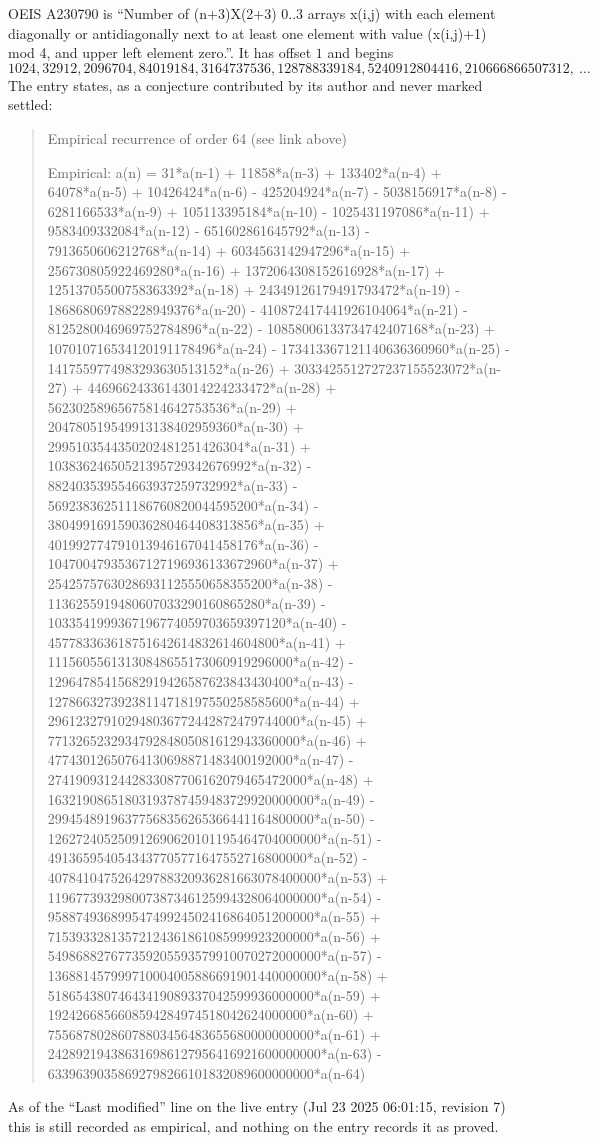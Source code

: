 \documentclass[11pt,a4paper]{article}
\theoremstyle{plain}
\theoremstyle{definition}
\begin{document}
OEIS A230790 is ``Number of (n+3)X(2+3) 0..3 arrays x(i,j) with each element diagonally or antidiagonally next to at least one element with value (x(i,j)+1) mod 4, and upper left element zero.''. It has offset $1$ and begins
\[
1024, 32912, 2096704, 84019184, 3164737536, 128788339184, 5240912804416, 210666866507312,\ \dots
\]
The entry states, as a conjecture contributed by its author and never marked settled:
\begin{quote}\raggedright\small
Empirical recurrence of order 64 (see link above)

Empirical: a(n) = 31*a(n-1) + 11858*a(n-3) + 133402*a(n-4) + 64078*a(n-5) + 10426424*a(n-6) - 425204924*a(n-7) - 5038156917*a(n-8) - 6281166533*a(n-9) + 105113395184*a(n-10) - 1025431197086*a(n-11) + 9583409332084*a(n-12) - 651602861645792*a(n-13) - 7913650606212768*a(n-14) + 6034563142947296*a(n-15) + 256730805922469280*a(n-16) + 1372064308152616928*a(n-17) + 12513705500758363392*a(n-18) + 24349126179491793472*a(n-19) - 186868069788228949376*a(n-20) - 410872417441926104064*a(n-21) - 8125280046969752784896*a(n-22) - 10858006133734742407168*a(n-23) + 107010716534120191178496*a(n-24) - 173413367121140636360960*a(n-25) - 1417559774983293630513152*a(n-26) + 3033425512727237155523072*a(n-27) + 44696624336143014224233472*a(n-28) + 56230258965675814642753536*a(n-29) + 204780519549913138402959360*a(n-30) + 2995103544350202481251426304*a(n-31) + 10383624650521395729342676992*a(n-32) - 882403539554663937259732992*a(n-33) - 569238362511186760820044595200*a(n-34) - 380499169159036280464408313856*a(n-35) + 401992774791013946167041458176*a(n-36) - 10470047935367127196936133672960*a(n-37) + 25425757630286931125550658355200*a(n-38) - 1136255919480607033290160865280*a(n-39) - 1033541999367196774059703659397120*a(n-40) - 457783363618751642614832614604800*a(n-41) + 11156055613130848655173060919296000*a(n-42) - 12964785415682919426587623843430400*a(n-43) - 12786632739238114718197550258585600*a(n-44) + 296123279102948036772442872479744000*a(n-45) + 771326523293479284805081612943360000*a(n-46) + 47743012650764130698871483400192000*a(n-47) - 2741909312442833087706162079465472000*a(n-48) + 16321908651803193787459483729920000000*a(n-49) - 29945489196377568356265366441164800000*a(n-50) - 126272405250912690620101195464704000000*a(n-51) - 4913659540543437705771647552716800000*a(n-52) - 407841047526429788320936281663078400000*a(n-53) + 119677393298007387346125994328064000000*a(n-54) - 95887493689954749924502416864051200000*a(n-55) + 71539332813572124361861085999923200000*a(n-56) + 549868827677359205593579910070272000000*a(n-57) - 136881457999710004005886691901440000000*a(n-58) + 51865438074643419089337042599936000000*a(n-59) + 1924266856608594284974518042624000000*a(n-60) + 75568780286078803456483655680000000000*a(n-61) + 242892194386316986127956416921600000000*a(n-63) - 63396390358692798266101832089600000000*a(n-64)
\end{quote}
As of the ``Last modified'' line on the live entry (Jul 23 2025 06:01:15, revision 7) this is still
recorded as empirical, and nothing on the entry records it as proved.
\end{document}
